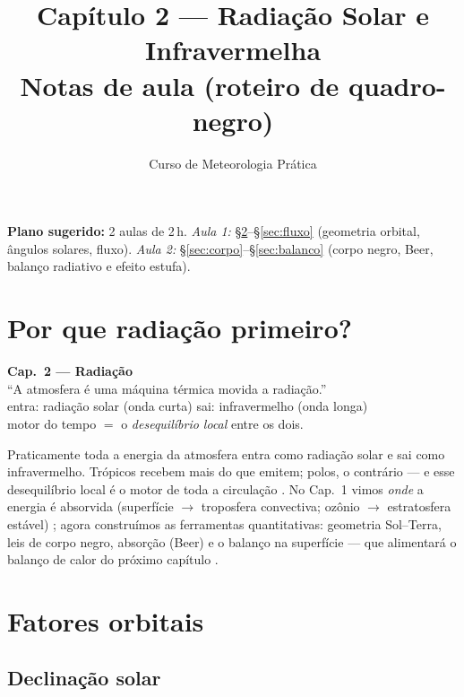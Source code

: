 \documentclass[11pt]{article}
\title{Capítulo 2 --- Radiação Solar e Infravermelha\\
{\large Notas de aula (roteiro de quadro-negro)}}
\author{Curso de Meteorologia Prática}
\date{}
\begin{document}
\maketitle
\thispagestyle{fancy}

\noindent\textbf{Plano sugerido:} 2 aulas de 2\,h.
\emph{Aula 1:} \S\ref{sec:orbita}--\S\ref{sec:fluxo} (geometria orbital, ângulos solares, fluxo).
\emph{Aula 2:} \S\ref{sec:corpo}--\S\ref{sec:balanco} (corpo negro, Beer, balanço radiativo e efeito estufa).

\section{Por que radiação primeiro?}

\begin{noquadro}[abertura]
\textbf{Cap.~2 --- Radiação}\\[2pt]
``A atmosfera é uma máquina térmica movida a radiação.''\\[2pt]
entra: radiação solar (onda curta) \quad sai: infravermelho (onda longa)\\
motor do tempo $=$ o \emph{desequilíbrio local} entre os dois.
\end{noquadro}

Praticamente toda a energia da atmosfera entra como radiação solar e sai
como infravermelho. Trópicos recebem mais do que emitem; polos, o
contrário — e esse desequilíbrio local é o motor de toda a circulação
. No Cap.~1 vimos
\emph{onde} a energia é absorvida (superfície $\to$ troposfera convectiva;
ozônio $\to$ estratosfera estável) ; agora
construímos as ferramentas quantitativas: geometria Sol--Terra, leis de
corpo negro, absorção (Beer) e o balanço na superfície — que alimentará o
balanço de calor do próximo capítulo .

\section{Fatores orbitais}\label{sec:orbita}

\subsection{Declinação solar}

\end{document}
